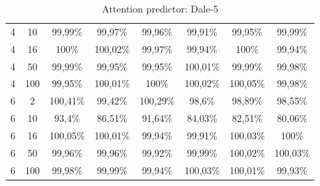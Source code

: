 \begin{table}[ht]
\begin{tabular}{cc|c|c|c|c|c|c}
        {4} & {10}  & {99,99\%}                           & {99,97\%}                           & {99,96\%}                           & {99,91\%}                           & {99,95\%}                           & {99,99\%}                           \\
        {4} & {16}  & {100\%}                             & {100,02\%}                          & {99,97\%}                           & {99,94\%}                           & {100\%}                             & {99,94\%}                           \\
        {4} & {50}  & {99,99\%}                           & {99,95\%}                           & {99,95\%}                           & {100,01\%}                          & {99,99\%}                           & {99,98\%}                           \\
        {4} & {100} & {99,95\%}                           & {100,01\%}                          & {100\%}                             & {100,02\%}                          & {100,05\%}                          & {99,98\%}                           \\
        {6} & {2}   & {100,41\%}                          & {99,42\%}                           & {100,29\%}                          & {98,6\%}                            & {98,89\%}                           & {98,55\%}                           \\
        {6} & {10}  & {93,4\%}                            & {86,51\%}                           & {91,64\%}                           & {84,03\%}                           & {82,51\%}                           & {80,06\%}                           \\
        {6} & {16}  & {100,05\%}                          & {100,01\%}                          & {99,94\%}                           & {99,91\%}                           & {100,03\%}                          & {100\%}                             \\
        {6} & {50}  & {99,96\%}                           & {99,96\%}                           & {99,92\%}                           & {99,99\%}                           & {100,02\%}                          & {100,03\%}                          \\
        {6} & {100} & {99,98\%}                           & {99,99\%}                           & {99,94\%}                           & {100,03\%}                          & {100,01\%}                          & {99,93\%}                           \\
        \bottomrule
    \end{tabular}
    \caption{Attention predictor: Dale-5}
    \label{TODO: label}
\end{table}